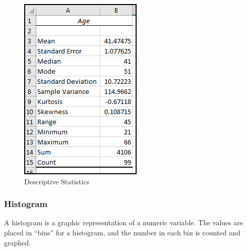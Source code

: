 \begin{figure}[H]
	\centering
	\includegraphics[width=\maxwidth{.40\linewidth}]{gfx/ch09_fig61}
	\caption{Descriptive Statistics}
	\label{09:fig61}
\end{figure}

\subsubsection{Histogram}

A histogram is a graphic representation of a numeric variable. The values are placed in ``bins'' for a histogram, and the number in each bin is counted and graphed. 

